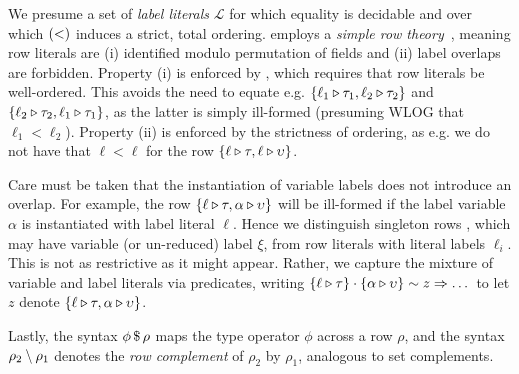 \documentclass[sigplan,screen]{acmart}
\begin{document}
We presume a set of \emph{label literals} $\mathcal L$ for which equality is decidable and over which $({<})$ induces a strict, total ordering. \Rome{} employs a \emph{simple row theory}~\citep{MorrisM19}, meaning row literals are (i) identified modulo permutation of fields and (ii) label overlaps are forbidden. Property (i) is enforced by , which requires that row literals be well-ordered. This avoids the need to equate e.g. $\{\ell_1 \triangleright \tau_1, \ell_2 \triangleright \tau_2\}$ and $\{\ell_2 \triangleright \tau_2, \ell_1 \triangleright \tau_1\}$, as the latter is simply ill-formed (presuming WLOG that $\ell_1 < \ell_2$). Property (ii) is enforced by the strictness of ordering, as e.g. we do not have that $\ell < \ell$ for the row $\{\ell \triangleright \tau, \ell \triangleright \upsilon\}$. 

Care must be taken that the instantiation of variable labels does not introduce an overlap. For example, the row $\{\ell \triangleright \tau, \alpha \triangleright \upsilon\}$ will be ill-formed if the label variable $\alpha$ is instantiated with label literal $\ell$. Hence we distinguish singleton rows , which may have variable (or un-reduced) label $\xi$, from row literals  with literal labels $\ell_i$. This is not as restrictive as it might appear. Rather, we capture the mixture of variable and label literals via predicates, writing $\{\ell \triangleright \tau\} \cdot \{\alpha \triangleright \upsilon\} \sim z \Rightarrow \dots$ to let $z$ denote $\{\ell \triangleright \tau, \alpha \triangleright \upsilon\}$. 

Lastly, the syntax ${\phi} \, \mathdollar \, \rho$ maps the type operator $\phi$ across a row $\rho$, and the syntax $\rho_2 \setminus \rho_1$ denotes the \emph{row complement} of $\rho_{2}$ by $\rho_{1}$, analogous to set complements.
\end{document}
